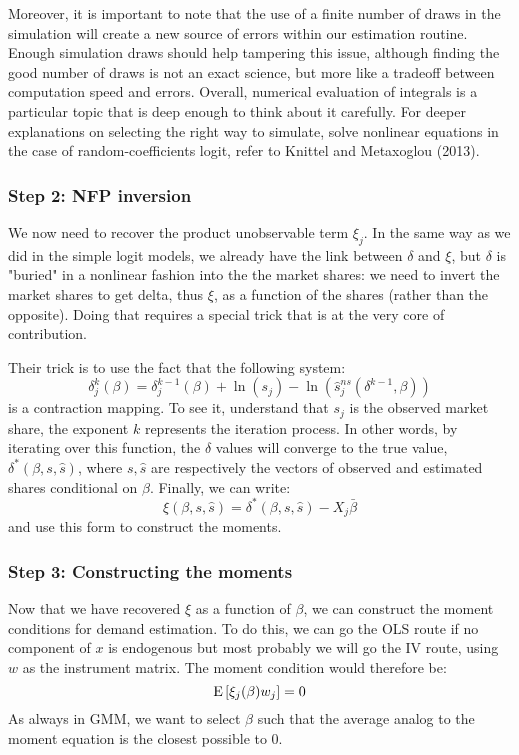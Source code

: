 Moreover, it is important to note that the use of a finite number of draws in the simulation will create a new source of errors within our estimation routine. Enough simulation draws should help tampering this issue, although finding the good number of draws is not an exact science, but more like a tradeoff between computation speed and errors. Overall, numerical evaluation of integrals is a particular topic that is deep enough to think about it carefully. For deeper explanations on selecting the right way to simulate, solve nonlinear equations in the case of random-coefficients logit, refer to Knittel and Metaxoglou (2013).

\subsubsection{Step 2: NFP inversion}

We now need to recover the product unobservable term $\xi_j$. In the same way as we did in the simple logit models, we already have the link between $\delta$ and $\xi$, but $\delta$ is "buried" in a nonlinear fashion into the the market shares: we need to invert the market shares to get delta, thus $\xi$, as a function of the shares (rather than the opposite). Doing that requires a special trick that is at the very core of\cite{blp_95} contribution.

Their trick is to use the fact that the following system: $$\delta_j^k(\beta) = \delta_j^{k-1}(\beta) + \ln(s_j) - \ln(\hat s_j^{ns}(\delta^{k-1}, \beta)) $$ is a contraction mapping. To see it, understand that $s_j$ is the observed market share, the exponent $k$ represents the iteration process. In other words, by iterating over this function, the $\delta$ values will converge to the true value, $\delta^*(\beta, s, \hat s)$, where $s, \hat s$ are respectively the vectors of observed and estimated shares conditional on $\beta$. Finally, we can write: $$\xi(\beta, s, \hat s) = \delta^*(\beta, s, \hat s) - X_j\bar\beta $$ and use this form to construct the moments.

\subsubsection{Step 3: Constructing the moments}

Now that we have recovered $\xi$ as a function of $\beta$, we can construct the moment conditions for demand estimation. To do this, we can go the OLS route if no component of $x$ is endogenous but most probably we will go the IV route, using $w$ as the instrument matrix. The moment condition would therefore be: $$ \operatorname{E}\left[\xi_j(\beta) w_j\right] = 0 $$ As always in GMM, we want to select $\beta$ such that the average analog to the moment equation is the closest possible to 0.

